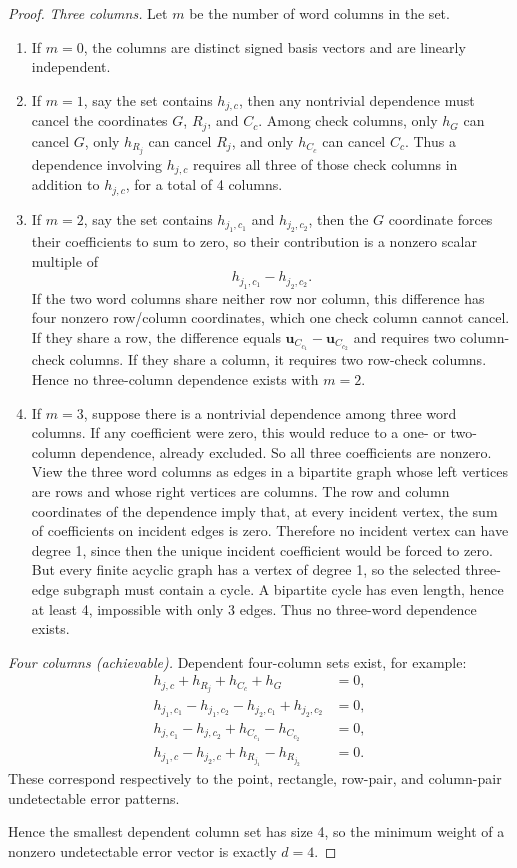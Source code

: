 \documentclass[11pt]{article}
\begin{document}
\begin{proof}
\textit{Three columns.} Let $m$ be the number of word columns in the set.
\begin{enumerate}[noitemsep]
    \item If $m = 0$, the columns are distinct signed basis vectors and are linearly independent.
    \item If $m = 1$, say the set contains $h_{j,c}$, then any nontrivial dependence must cancel the coordinates $G$, $R_j$, and $C_c$. Among check columns, only $h_G$ can cancel $G$, only $h_{R_j}$ can cancel $R_j$, and only $h_{C_c}$ can cancel $C_c$. Thus a dependence involving $h_{j,c}$ requires all three of those check columns in addition to $h_{j,c}$, for a total of 4 columns.
    \item If $m = 2$, say the set contains $h_{j_1,c_1}$ and $h_{j_2,c_2}$, then the $G$ coordinate forces their coefficients to sum to zero, so their contribution is a nonzero scalar multiple of
    \[
        h_{j_1,c_1} - h_{j_2,c_2}.
    \]
    If the two word columns share neither row nor column, this difference has four nonzero row/column coordinates, which one check column cannot cancel. If they share a row, the difference equals $\mathbf{u}_{C_{c_1}} - \mathbf{u}_{C_{c_2}}$ and requires two column-check columns. If they share a column, it requires two row-check columns. Hence no three-column dependence exists with $m = 2$.
    \item If $m = 3$, suppose there is a nontrivial dependence among three word columns. If any coefficient were zero, this would reduce to a one- or two-column dependence, already excluded. So all three coefficients are nonzero. View the three word columns as edges in a bipartite graph whose left vertices are rows and whose right vertices are columns. The row and column coordinates of the dependence imply that, at every incident vertex, the sum of coefficients on incident edges is zero. Therefore no incident vertex can have degree 1, since then the unique incident coefficient would be forced to zero. But every finite acyclic graph has a vertex of degree 1, so the selected three-edge subgraph must contain a cycle. A bipartite cycle has even length, hence at least 4, impossible with only 3 edges. Thus no three-word dependence exists.
\end{enumerate}

\textit{Four columns (achievable).} Dependent four-column sets exist, for example:
\begin{align*}
    h_{j,c} + h_{R_j} + h_{C_c} + h_G &= 0, \\
    h_{j_1,c_1} - h_{j_1,c_2} - h_{j_2,c_1} + h_{j_2,c_2} &= 0, \\
    h_{j,c_1} - h_{j,c_2} + h_{C_{c_1}} - h_{C_{c_2}} &= 0, \\
    h_{j_1,c} - h_{j_2,c} + h_{R_{j_1}} - h_{R_{j_2}} &= 0.
\end{align*}
These correspond respectively to the point, rectangle, row-pair, and column-pair undetectable error patterns.

Hence the smallest dependent column set has size 4, so the minimum weight of a nonzero undetectable error vector is exactly $d = 4$.
\end{proof}
\end{document}
